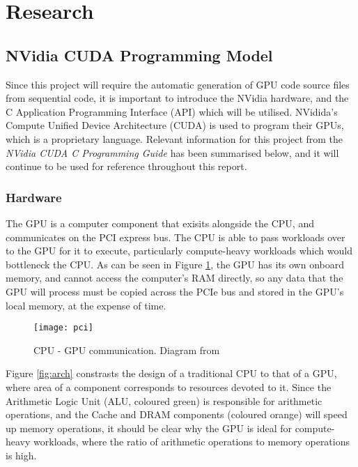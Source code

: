 
\section{Research}
\label{s:research}
\vspace{-2em}
\subsection{NVidia CUDA Programming Model}
Since this project will require the automatic generation of GPU code source files from sequential code, it is important to introduce the NVidia hardware, and the C Application Programming Interface (API) which will be utilised. NVidida's Compute Unified Device Architecture (CUDA) is used to program their GPUs, which is a proprietary language. Relevant information for this project from the \textit{NVidia CUDA C Programming Guide} \cite{guide} has been summarised below, and it will continue to be used for reference throughout this report.

\subsubsection{Hardware}
The GPU is a computer component that exisits alongside the CPU, and communicates on the PCI express bus. The CPU is able to pass workloads over to the GPU for it to execute, particularly compute-heavy workloads which would bottleneck the CPU. As can be seen in Figure \ref{fig:pci}, the GPU has its own onboard memory, and cannot access the computer's RAM directly, so any data that the GPU will process must be copied across the PCIe bus and stored in the GPU's local memory, at the expense of time.

\begin{figure}[h!]
  \centering
  \texttt{[image: pci]}
  \caption{\label{fig:pci} CPU - GPU communication. Diagram from \cite{nvlink}}
\end{figure}

\par
Figure \ref{fig:arch} constrasts the design of a traditional CPU to that of a GPU, where area of a component corresponds to resources devoted to it. Since the Arithmetic Logic Unit (ALU, coloured green) is responsible for arithmetic operations, and the Cache and DRAM components (coloured orange) will speed up memory operations, it should be clear why the GPU is ideal for compute-heavy workloads, where the ratio of arithmetic operations to memory operations is high.

